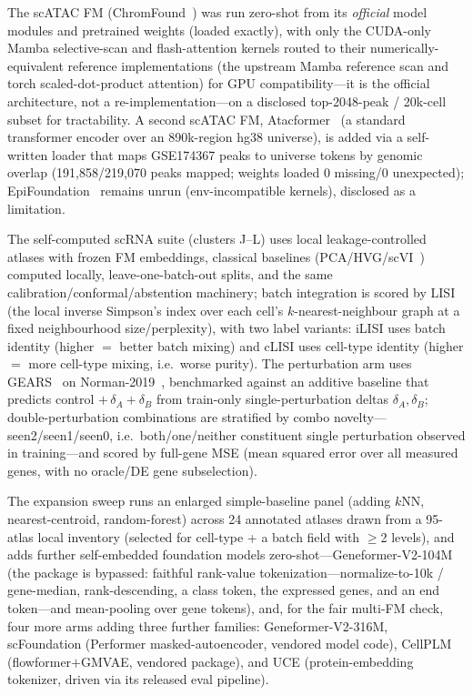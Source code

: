 \documentclass[11pt]{article}
\begin{document}
The scATAC FM (ChromFound~\cite{chromfound2025}) was run zero-shot from its \emph{official} model modules and pretrained weights (loaded exactly), with only the CUDA-only Mamba selective-scan and flash-attention kernels routed to their numerically-equivalent reference implementations (the upstream Mamba reference scan and torch scaled-dot-product attention) for GPU compatibility---it is the official architecture, not a re-implementation---on a disclosed top-2048-peak / 20k-cell subset for tractability. A second scATAC FM, Atacformer~\cite{atacformer2024} (a standard transformer encoder over an 890k-region hg38 universe), is added via a self-written loader that maps GSE174367 peaks to universe tokens by genomic overlap (191{,}858/219{,}070 peaks mapped; weights loaded 0 missing/0 unexpected); EpiFoundation~\cite{epifoundation2025} remains unrun (env-incompatible kernels), disclosed as a limitation.

The self-computed scRNA suite (clusters J--L) uses local leakage-controlled atlases with frozen FM embeddings, classical baselines (PCA/HVG/scVI~\cite{lopez2018}) computed locally, leave-one-batch-out splits, and the same calibration/conformal/abstention machinery; batch integration is scored by LISI (the local inverse Simpson's index over each cell's $k$-nearest-neighbour graph at a fixed neighbourhood size/perplexity), with two label variants: iLISI uses batch identity (higher $=$ better batch mixing) and cLISI uses cell-type identity (higher $=$ more cell-type mixing, i.e.\ worse purity). The perturbation arm uses GEARS~\cite{roohani2024} on Norman-2019~\cite{norman2019}, benchmarked against an additive baseline that predicts control $+\,\delta_A+\delta_B$ from train-only single-perturbation deltas $\delta_A,\delta_B$; double-perturbation combinations are stratified by combo novelty---seen2/seen1/seen0, i.e.\ both/one/neither constituent single perturbation observed in training---and scored by full-gene MSE (mean squared error over all measured genes, with no oracle/DE gene subselection).

The expansion sweep runs an enlarged simple-baseline panel (adding $k$NN, nearest-centroid, random-forest) across 24 annotated atlases drawn from a 95-atlas local inventory (selected for cell-type + a batch field with $\geq$2 levels), and adds further self-embedded foundation models zero-shot---Geneformer-V2-104M (the package is bypassed: faithful rank-value tokenization---normalize-to-10k / gene-median, rank-descending, a class token, the expressed genes, and an end token---and mean-pooling over gene tokens), and, for the fair multi-FM check, four more arms adding three further families: Geneformer-V2-316M, scFoundation (Performer masked-autoencoder, vendored model code), CellPLM (flowformer$+$GMVAE, vendored package), and UCE (protein-embedding tokenizer, driven via its released eval pipeline).
\end{document}
